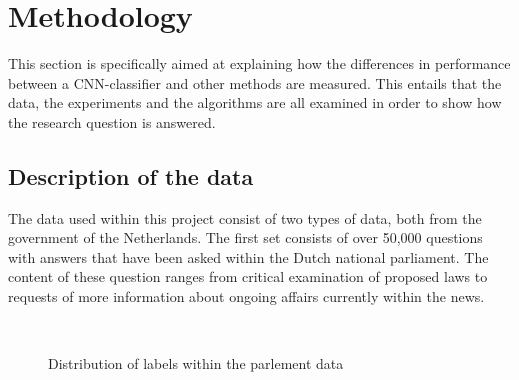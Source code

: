 \section{Methodology}
\label{sec:meth}
This section is specifically aimed at explaining how the differences in performance between a CNN-classifier and other methods are measured. This entails that the data, the experiments and the algorithms are all examined in order to show how the research question is answered. \\


\subsection{Description of the data}
\label{subsec:data}
The data used within this project consist of two types of data, both from the government of the Netherlands. The first set consists of over 50,000 questions with answers that have been asked within the Dutch national parliament. The content of these question ranges from critical examination of proposed laws to requests of more information about ongoing affairs currently within the news.\\ 

\begin{figure}[H]
	\begin{center}
		~
		\caption{Distribution of labels within the parlement data}
		\label{fig:distributiontopics}
	\end{center}
\end{figure}

